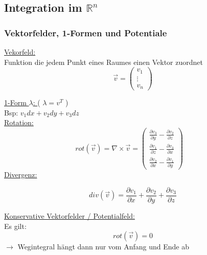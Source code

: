\documentclass[6pt]{article}
\begin{document}
\begin{multicols*}{3}
			\vspace{15mm} 
			\quad


\pagebreak
\subsection*{Integration im $\mathbb{R}^n$}
	

	\subsubsection*{Vektorfelder, 1-Formen und Potentiale}

	\underline{Vekorfeld:} \\
		Funktion die jedem Punkt eines Raumes einen Vektor zuordnet 
		\[
				\vec{v} = \begin{pmatrix} v_1 \\ \vdots \\ v_n\end{pmatrix} 
		\]
		
		\underline{1-Form $\lambda$: }  \quad ( $\lambda = v^T$ ) \\
		
		Bsp: \quad $v_1 dx + v_2 dy + v_3 dz$ \vspace{2mm}\\

		\underline{Rotation:}
		\[
				rot(\vec{v}) = \nabla \times \vec{v} = 
				\begin{pmatrix} 
					\frac{\partial v_3}{\partial y} - \frac{\partial v_2}{\partial z} \\
					\frac{\partial v_1}{\partial z} - \frac{\partial v_3}{\partial x} \\
					\frac{\partial v_2}{\partial x} - \frac{\partial v_1}{\partial y} 
				\end{pmatrix}
				\quad
		\]
		\underline{Divergenz:} 
		
		\[
				div(\vec{v}) = \frac{\partial v_1}{\partial x} + \frac{\partial v_2}{\partial y} + \frac{\partial v_3}{\partial z}
		\]
		\vspace{2mm}
		
	

	\underline{Konservative Vektorfelder / Potentialfeld:}  \vspace{1mm}\\
	Es gilt:
	\[
			rot(\vec{v}) = 0
	\]
	 $\rightarrow$ Wegintegral h{\"a}ngt dann nur vom Anfang und Ende ab \vspace{2mm}\\
	

\end{multicols*}
\end{document}
